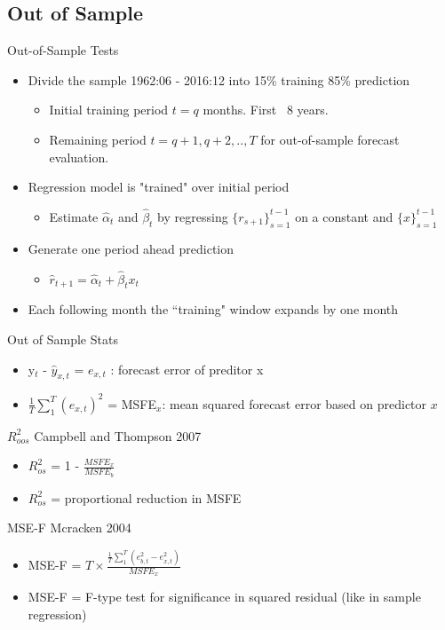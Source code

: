 \documentclass{beamer}
\begin{document}
\subsection{Out of Sample}
\begin{frame}{Out-of-Sample Tests}
	\begin{itemize}[<+->]
		\item Divide the sample 1962:06 - 2016:12 into 15\% training 85\% prediction
		\begin{itemize}
			\item Initial training period $t = q$ months. First ~8 years.
			\item Remaining period $t = q+1, q+2,..,T$ for out-of-sample forecast evaluation.
		\end{itemize}
		\item Regression model is "trained" over initial period
		\begin{itemize}
			\item Estimate $\hat \alpha_{t}$ and $\hat \beta_{t}$ by regressing $\{r_{s+1}\}_{s=1}^{t-1}$ on a constant and $\{x\}_{s=1}^{t-1}$
		\end{itemize}
		\item Generate one period ahead prediction \\
		\begin{itemize}
			\item $\hat r_{t+1} = \hat \alpha_{t} + \hat \beta_{t}x_{t}$
		\end{itemize}
		\item Each following month the ``training" window expands by one month
	\end{itemize}
\end{frame}

\begin{frame}{Out of Sample Stats}
	    \begin{itemize}
	    	\item y$_{t}$ - $\hat{y}_{x,t}$ =  $e_{x,t}$ : forecast error of preditor x
	    	\item $\frac{1}{T}\sum_{1}^{T}(e_{x,t})^{2}$ = MSFE$_{x}$: mean squared forecast error based on predictor $x$
	    \end{itemize}
	    \begin{block}{$R_{oos}^{2}$ Campbell and Thompson 2007}
	    	\begin{itemize}
	    		\item $R^{2}_{os}$ = 1 - $\frac{MSFE_{x}}{MSFE_{b}}$
	    		\item $R^{2}_{os}$ = proportional reduction in MSFE
	    	\end{itemize}
	    \end{block}
	    \begin{block}{MSE-F Mcracken 2004}
	    	\begin{itemize}
	    		\item MSE-F = $T \times \frac{\frac{1}{T}\sum_{1}^{T}(e_{b,t}^{2}-e_{x,t}^{2})}{MSFE_{x}}$
	    		\item MSE-F = F-type test for significance in squared residual (like in sample regression)
	    	\end{itemize}
	    \end{block}
\end{frame}
\end{document}
